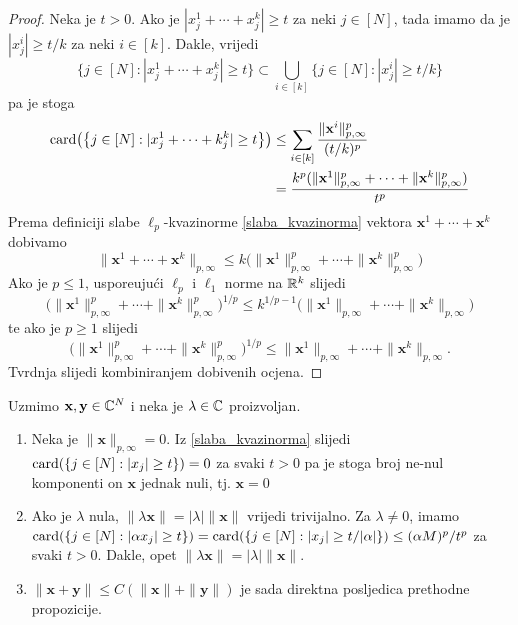 \documentclass[a4paper,twoside,12pt]{memoir} %
\newcommand{\vect}[1]{\mathbf{#1}}
\newcommand{\card}{\text{\normalfont{card}}}
\begin{document}
\begin{proof}
    Neka je $t>0$. Ako je $|x_j^1+\cdots+x_j^k|\geq t$ za neki $j\in [N]$, tada imamo da je $|x_j^i|\geq t/k$ za neki $i \in [k]$. Dakle, vrijedi
    \begin{equation*}
        \big\{ j\in [N]:|x_j^1+\cdots+x_j^k| \geq t \big\} \subset \bigcup\limits_{i\in [k]} \big \{ j \in [N] : |x_j^i| \geq t/k \big \}
    \end{equation*}
    pa je stoga
    \begin{align*}
        \card\big( \big\{ j\in [N] : |x_j^1+\cdots+k_j^k| \geq t \big\}\big)&\leq\sum\limits_{i\in [k]}\frac{\|\vect{x}^i\|^p_{p, \infty}}{(t/k)^p} \\ 
                                                                            &= \frac{k^p(\|\vect{x}^1\|^p_{p, \infty}+\cdots + \|\vect{x}^k\|^p_{p, \infty})}{t^p}
    \end{align*}
    Prema definiciji slabe $\ell_p$-kvazinorme \eqref{slaba_kvazinorma} vektora $\vect{x}^1+\cdots+\vect{x}^k$ dobivamo
    \begin{equation*}
        \|\vect{x}^1+\cdots+\vect{x}^k\|_{p, \infty}\leq k\big(\|\vect{x}^1\|^p_{p,\infty}+ \cdots +\|\vect{x}^k\|^p_{p,\infty}\big) 
    \end{equation*}
    Ako je $p \leq 1$, uspore\dj uju\'ci $\ell_p$ i $\ell_1$ norme na $\mathbb{R}^k$ slijedi
    \begin{equation*}
        \big(\|\vect{x}^1\|^p_{p,\infty}+ \cdots +\|\vect{x}^k\|^p_{p,\infty}\big)^{1/p} \leq k^{1/p-1}\big(\|\vect{x}^1\|_{p,\infty}+ \cdots +\|\vect{x}^k\|_{p,\infty}\big)
    \end{equation*}
    te ako je $p \geq 1$ slijedi
    \begin{equation*}
        \big(\|\vect{x}^1\|^p_{p,\infty}+ \cdots +\|\vect{x}^k\|^p_{p,\infty}\big)^{1/p} \leq \|\vect{x}^1\|_{p,\infty}+ \cdots +\|\vect{x}^k\|_{p,\infty}.
    \end{equation*}
    Tvrdnja slijedi kombiniranjem dobivenih ocjena.
\end{proof}

\noindent
Uzmimo $\vect{x}, \vect{y} \in \C^N$ i neka je $\lambda \in \mathbb{C}$ proizvoljan.

\begin{enumerate}
    \item Neka je $\|\vect{x}\|_{p, \infty}=0$. Iz \eqref{slaba_kvazinorma} slijedi $ \card(\{j \in [N]: |x_j| \geq t\}) = 0$ za svaki $t > 0$ pa je stoga broj ne-nul komponenti on $\vect{x}$ jednak nuli, tj. $\vect{x}=0$ 
    \item Ako je $\lambda$ nula, $\|\lambda \vect{x}\| = | \lambda | \| \vect{x} \|$ vrijedi trivijalno. Za $\lambda \neq 0$, imamo \\
        $\card(\{ j \in [N]: |\alpha x_j| \geq t \}) = \card(\{ j \in [N]: |x_j| \geq t/|\alpha| \})\leq (\alpha M)^p/t^p$ za svaki $t>0$. Dakle, opet $\|\lambda \vect{x}\| = | \lambda | \| \vect{x} \|$.
    \item $\|\vect{x}+\vect{y}\|\leq C(\|\vect{x}\|+\|\vect{y}\|)$ je sada direktna posljedica prethodne propozicije.
\end{enumerate}
\end{document}
